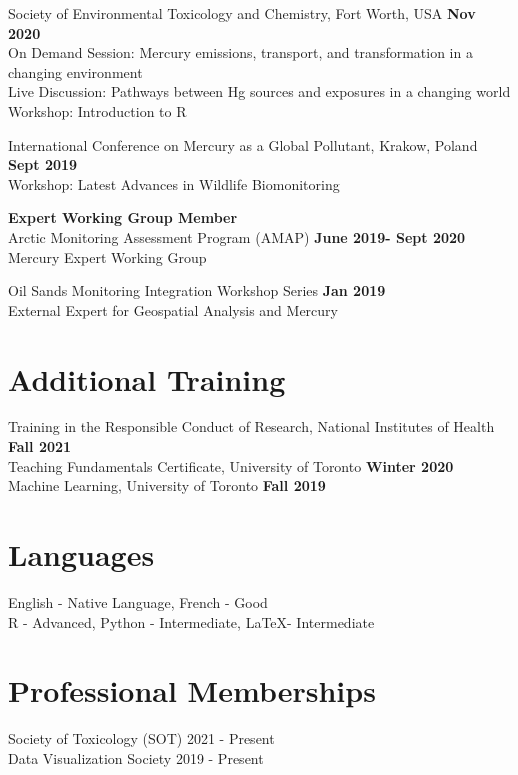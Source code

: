 \documentclass[margin,line]{res}
\begin{document}
\begin{resume}
Society of Environmental Toxicology and Chemistry, Fort Worth, USA \hfill {\bf  Nov 2020}\\
On Demand Session: Mercury emissions, transport, and transformation in a changing environment\\
Live Discussion: Pathways between Hg sources and exposures in a changing world\\
Workshop: Introduction to R

International Conference on Mercury as a Global Pollutant, Krakow, Poland \hfill {\bf Sept 2019}\\
Workshop: Latest Advances in Wildlife Biomonitoring

{\bf Expert Working Group Member}\\
Arctic Monitoring Assessment Program (AMAP)
\hfill {\bf  June 2019- Sept 2020}\\
Mercury Expert Working Group

Oil Sands Monitoring Integration Workshop Series
\hfill {\bf  Jan 2019}\\
External Expert for Geospatial Analysis and Mercury

\vspace*{.1in}

\section{\sc Additional Training}
Training in the Responsible Conduct of Research, National Institutes of Health \hfill {\bf  Fall 2021}\\
Teaching Fundamentals Certificate, University of Toronto
\hfill {\bf  Winter 2020}\\
Machine Learning, University of Toronto
\hfill {\bf  Fall 2019}

\vspace*{.1in}

\section{\sc Languages}

English - Native Language, French - Good\\
R - Advanced, Python - Intermediate, LaTeX- Intermediate

\vspace*{.1in}

\section{\sc Professional Memberships}
Society of Toxicology (SOT) 2021 - Present \\
Data Visualization Society 2019 - Present\\


\end{resume}
\end{document}
